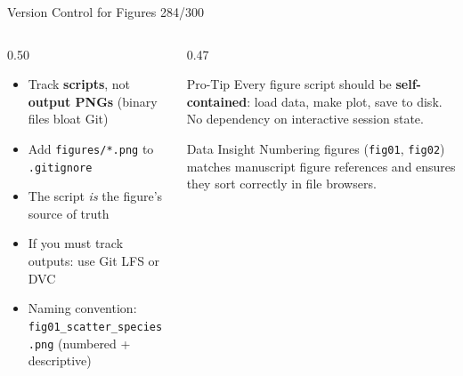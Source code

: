 \documentclass[10pt]{beamer}
\newcommand{\smark}[1]{\hfill{\scriptsize\color{codegray}#1}}
\begin{document}
\begin{frame}{Version Control for Figures}
\smark{284/300}
\begin{columns}[T]
\begin{column}{0.50\textwidth}
\begin{itemize}
    \item Track \textbf{scripts}, not \textbf{output PNGs} (binary files bloat Git)
    \item Add \texttt{figures/*.png} to \texttt{.gitignore}
    \item The script \emph{is} the figure's source of truth
    \item If you must track outputs: use Git LFS or DVC
    \item Naming convention: \texttt{fig01\_scatter\_species.png} (numbered + descriptive)
\end{itemize}
\end{column}
\begin{column}{0.47\textwidth}
\begin{alertblock}{Pro-Tip}
    \scriptsize Every figure script should be \textbf{self-contained}: load data, make plot, save to disk. No dependency on interactive session state.
\end{alertblock}
\vspace{0.2cm}
\begin{exampleblock}{Data Insight}
    \scriptsize Numbering figures (\texttt{fig01}, \texttt{fig02}) matches manuscript figure references and ensures they sort correctly in file browsers.
\end{exampleblock}
\end{column}
\end{columns}
\end{frame}
\end{document}
